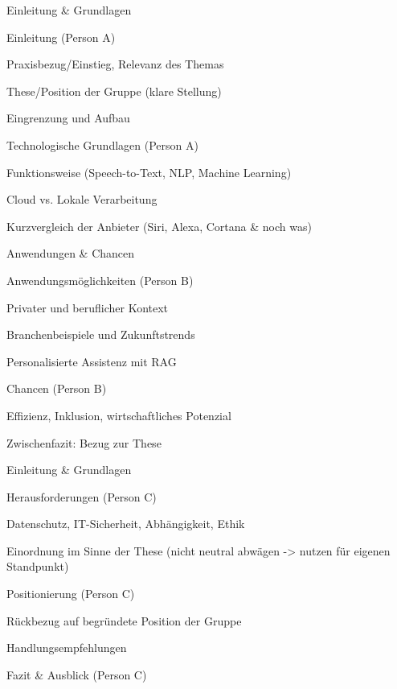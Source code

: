 Einleitung & Grundlagen 

Einleitung (Person A) 

Praxisbezug/Einstieg, Relevanz des Themas 

These/Position der Gruppe (klare Stellung) 

Eingrenzung und Aufbau 

Technologische Grundlagen (Person A) 

Funktionsweise (Speech-to-Text, NLP, Machine Learning) 

Cloud vs. Lokale Verarbeitung 

Kurzvergleich der Anbieter (Siri, Alexa, Cortana & noch was) 

Anwendungen & Chancen 

Anwendungsmöglichkeiten (Person B) 

Privater und beruflicher Kontext 

Branchenbeispiele und Zukunftstrends 

Personalisierte Assistenz mit RAG 

Chancen (Person B) 

Effizienz, Inklusion, wirtschaftliches Potenzial 

Zwischenfazit: Bezug zur These 

Einleitung & Grundlagen 

Herausforderungen (Person C) 

Datenschutz, IT-Sicherheit, Abhängigkeit, Ethik 

Einordnung im Sinne der These (nicht neutral abwägen -> nutzen für eigenen Standpunkt) 

Positionierung (Person C) 

Rückbezug auf begründete Position der Gruppe 

Handlungsempfehlungen 

Fazit & Ausblick (Person C) 